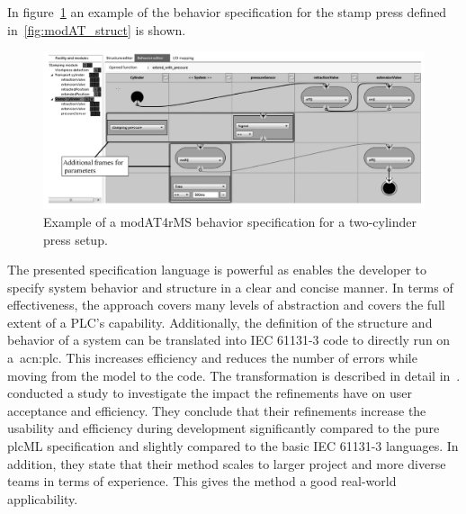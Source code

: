 In figure~\ref{fig:modAT_beh} an example of the behavior specification for the stamp press defined in~\ref{fig:modAT_struct} is shown.
\begin{figure}[h]
	\includegraphics[width=\textwidth]{./Figures/modAT4rMS_beh.png}
	\caption[Example of a modAT4rMS behavior specification for a two-cylinder press setup.]{Example of a modAT4rMS behavior specification for a two-cylinder press setup.~\cite{Obermeier:2015aa}}
	\label{fig:modAT_beh}
\end{figure}
The presented specification language is powerful as enables the developer to specify system behavior and structure in a clear and concise manner.
In terms of effectiveness, the approach covers many levels of abstraction and covers the full extent of a PLC's capability.
Additionally, the definition of the structure and behavior of a system can be translated into IEC 61131-3 code to directly run on a~\acrshort{acn:plc}.
This increases efficiency and reduces the number of errors while moving from the model to the code.
The transformation is described in detail in~\cite{WITSCH2015}.
\citeauthor{Obermeier:2015aa} conducted a study to investigate the impact the refinements have on user acceptance and efficiency.
They conclude that their refinements increase the usability and efficiency during development significantly compared to the pure plcML specification and slightly compared to the basic IEC 61131-3 languages.
In addition, they state that their method scales to larger project and more diverse teams in terms of experience.
This gives the method a good real-world applicability.

